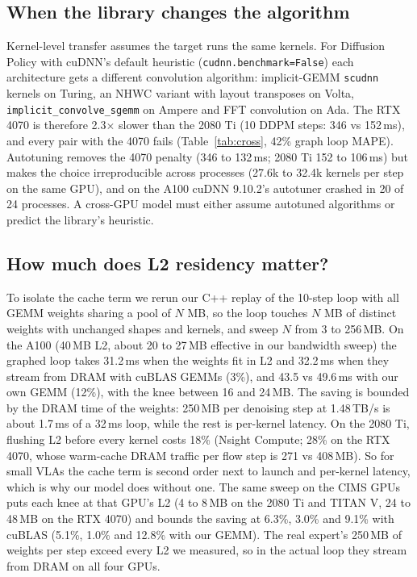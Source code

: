 \documentclass[10pt,twocolumn]{article}
\begin{document}
\subsection{When the library changes the algorithm}
Kernel-level transfer assumes the target runs the same kernels. For Diffusion Policy with
cuDNN's default heuristic (\texttt{cudnn.benchmark=False}) each architecture gets a different
convolution algorithm: implicit-GEMM \texttt{scudnn} kernels on Turing, an NHWC variant with
layout transposes on Volta, \texttt{implicit\_convolve\_sgemm} on Ampere and FFT convolution on
Ada. The RTX 4070 is therefore 2.3$\times$ slower than the 2080 Ti (10 DDPM steps: 346 vs
152\,ms), and every pair with the 4070 fails (Table~\ref{tab:cross}, 42\% graph loop MAPE).
Autotuning removes the 4070 penalty (346 to 132\,ms; 2080 Ti 152 to 106\,ms) but makes the
choice irreproducible across processes (27.6k to 32.4k kernels per step on the same GPU), and on
the A100 cuDNN 9.10.2's autotuner crashed in 20 of 24 processes. A cross-GPU model must either
assume autotuned algorithms or predict the library's heuristic.

\subsection{How much does L2 residency matter?}\label{sec:l2}
To isolate the cache term we rerun our C++ replay of the 10-step loop with all GEMM weights
sharing a pool of $N$ MB, so the loop touches $N$ MB of distinct weights with unchanged shapes
and kernels, and sweep $N$ from 3 to 256\,MB. On the A100 (40\,MB L2, about 20 to 27\,MB
effective in our bandwidth sweep) the graphed loop takes 31.2\,ms when the weights fit in L2 and
32.2\,ms when they stream from DRAM with cuBLAS GEMMs (3\%), and 43.5 vs 49.6\,ms with our own
GEMM (12\%), with the knee between 16 and 24\,MB. The saving is bounded by the DRAM time of the
weights: 250\,MB per denoising step at 1.48\,TB/s is about 1.7\,ms of a 32\,ms loop, while the
rest is per-kernel latency. On the 2080 Ti, flushing L2 before every kernel costs 18\% (Nsight
Compute; 28\% on the RTX 4070, whose warm-cache DRAM traffic per flow step is 271 vs 408\,MB). So
for small VLAs the cache term is second order next to launch and per-kernel latency, which is
why our model does without one. The same sweep on the CIMS GPUs puts each knee at that GPU's L2
(4 to 8\,MB on the 2080 Ti and TITAN V, 24 to 48\,MB on the RTX 4070) and bounds the saving at
6.3\%, 3.0\% and 9.1\% with cuBLAS (5.1\%, 1.0\% and 12.8\% with our GEMM). The real expert's
250\,MB of weights per step exceed every L2 we measured, so in the actual loop they stream from
DRAM on all four GPUs.
\end{document}
